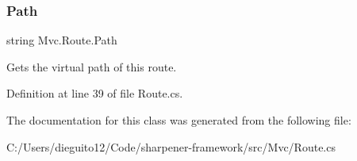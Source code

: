 \subsubsection{\texorpdfstring{Path}{Path}}
{\footnotesize\ttfamily string Mvc.\+Route.\+Path\hspace{0.3cm}{\ttfamily [get]}}



Gets the virtual path of this route. 



Definition at line 39 of file Route.\+cs.



The documentation for this class was generated from the following file\+:\begin{DoxyCompactItemize}
\item 
C\+:/\+Users/dieguito12/\+Code/sharpener-\/framework/src/\+Mvc/Route.\+cs\end{DoxyCompactItemize}
